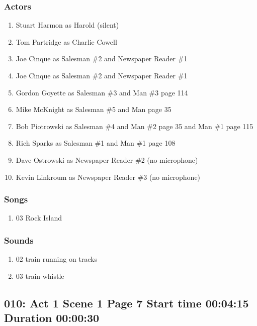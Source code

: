 \subsubsection{Actors}
\begin{enumerate}
\item Stuart Harmon as Harold (silent)
\item Tom Partridge as Charlie Cowell
\item Joe Cinque as Salesman \#2 and Newspaper Reader \#1
\item Joe Cinque as Salesman \#2 and Newspaper Reader \#1
\item Gordon Goyette as Salesman \#3 and Man \#3 page 114
\item Mike McKnight as Salesman \#5 and Man page 35
\item Bob Piotrowski as Salesman \#4 and Man \#2 page 35 and Man \#1 page 115
\item Rich Sparks as Salesman \#1 and Man \#1 page 108
\item Dave Ostrowski as Newspaper Reader \#2 (no microphone)
\item Kevin Linkroum as Newspaper Reader \#3 (no microphone)
\end{enumerate}

\subsubsection{Songs}
\begin{enumerate}
\item 03 Rock Island
\end{enumerate}\subsubsection{Sounds}
\begin{enumerate}
\item 02 train running on tracks
\item 03 train whistle
\end{enumerate}
\subsection{010: Act 1 Scene 1 Page 7 Start time 00:04:15 Duration 00:00:30}

